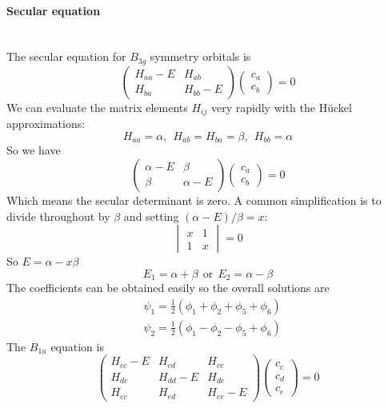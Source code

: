\paragraph{Secular equation}~\\
The secular equation for $B_{3g}$ symmetry orbitals is
\begin{equation}
	\begin{pmatrix}
		H_{aa}-E & H_{ab}\\
		H_{ba} & H_{bb}-E
	\end{pmatrix}
	\begin{pmatrix}
		c_a\\
		c_b
	\end{pmatrix}
	=0
\end{equation}
We can evaluate the matrix elements $H_{ij}$ very rapidly with the H{\" u}ckel approximations:
\begin{equation}
	H_{aa}=\alpha,\ \ H_{ab}=H_{ba}=\beta,\ \ H_{bb}=\alpha
\end{equation}
So we have
\begin{equation}
	\begin{pmatrix}
		\alpha-E & \beta\\
		\beta & \alpha-E
	\end{pmatrix}
	\begin{pmatrix}
		c_a\\
		c_b
	\end{pmatrix}
	=0
\end{equation}
Which means the secular determinant is zero. A common simplification is to divide throughout by $\beta$ and setting $(\alpha-E)/\beta=x$:
\begin{equation}
	\begin{vmatrix}
		x&1\\
		1&x
	\end{vmatrix}=0
\end{equation}
So $E=\alpha-x\beta$
\begin{equation}
	E_1=\alpha+\beta\ \ \text{or}\ \ E_2=\alpha-\beta
\end{equation}
The coefficients can be obtained easily so the overall solutions are
\begin{equation}
\begin{aligned}
	&\psi_1=\tfrac{1}{2}(\phi_1+\phi_2+\phi_5+\phi_6)\\
	&\psi_2=\tfrac{1}{2}(\phi_1-\phi_2-\phi_5+\phi_6)
\end{aligned}
\end{equation}
The $B_{1u}$ equation is
\begin{equation}
		\begin{pmatrix}
		H_{cc}-E & H_{cd} &H_{ce}\\
		H_{dc} & H_{dd}-E &H_{de}\\
		H_{ec} & H_{ed} & H_{ee}-E
	\end{pmatrix}
	\begin{pmatrix}
		c_c\\
		c_d\\
		c_e
	\end{pmatrix}
	=0
\end{equation}
